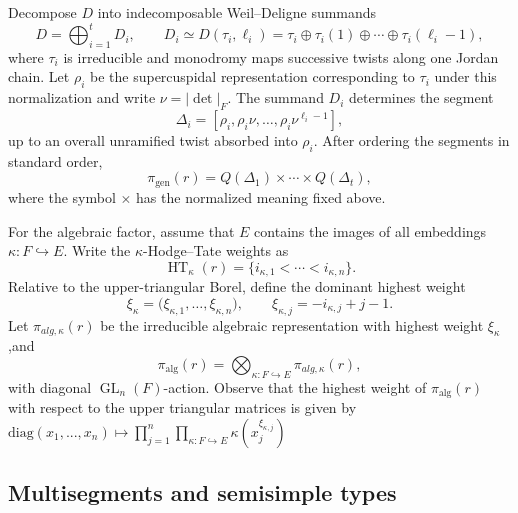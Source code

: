 \documentclass[12pt]{article}
\theoremstyle{definition}
\theoremstyle{remark}
\DeclareMathOperator{\GL}{GL}
\begin{document}
Decompose $D$ into indecomposable Weil--Deligne summands
\begin{equation}\label{eq:WD-indecomposable-decomposition}
 D=\bigoplus_{i=1}^t D_i,
 \qquad
 D_i\simeq D(\tau_i,\ell_i)
 =\tau_i\oplus\tau_i(1)\oplus\cdots\oplus\tau_i(\ell_i-1),
\end{equation}
where $\tau_i$ is irreducible and monodromy maps successive twists along one
Jordan chain.  Let $\rho_i$ be the supercuspidal representation corresponding
to $\tau_i$ under this normalization and write $\nu=|\det|_F$.  The summand
$D_i$ determines the segment
\begin{equation}\label{eq:WD-to-segment}
 \Delta_i=[\rho_i,\rho_i\nu,\ldots,\rho_i\nu^{\ell_i-1}],
\end{equation}
up to an overall unramified twist absorbed into $\rho_i$.  After ordering the
segments in standard order,
\begin{equation}\label{eq:pi-gen-from-WD}
 \pi_{\mathrm{gen}}(r)
 =Q(\Delta_1)\times\cdots\times Q(\Delta_t),
\end{equation}
where the symbol $\times$ has the normalized meaning fixed above.

For the algebraic factor, assume that $E$ contains the images of all
embeddings $\kappa:F\hookrightarrow E$.  Write the $\kappa$-Hodge--Tate weights as
\[
 \operatorname{HT}_\kappa(r)
 =\{i_{\kappa,1}<\cdots<i_{\kappa,n}\}.
\]
Relative to the upper-triangular Borel, define the dominant highest weight
\begin{equation}\label{eq:BS-highest-weight}
 \xi_\kappa
 =\bigl(\xi_{\kappa,1},\ldots,\xi_{\kappa,n}\bigr),
 \qquad
 \xi_{\kappa,j}=-i_{\kappa,j}+j-1.
\end{equation}
Let $\pi_{alg, \kappa}(r)$ be the irreducible algebraic representation with highest
weight $\xi_\kappa$,and
\begin{equation}\label{eq:pi-alg-from-HT}
 \pi_{\mathrm{alg}}(r)
 =\bigotimes_{\kappa:F\hookrightarrow E}\pi_{alg, \kappa}(r),
\end{equation}
with diagonal $\GL_n(F)$-action. Observe that the highest weight of $\pi_{\mathrm{alg}}(r)$ with respect to the upper triangular matrices is given by $ \mathrm{diag}(x_1,..., x_n) \mapsto \prod_{j=1}^{n}\prod_{\kappa:F\hookrightarrow E} \kappa(x_j^{\xi_{\kappa,j}})$

\subsection{Multisegments and semisimple types}
\end{document}
